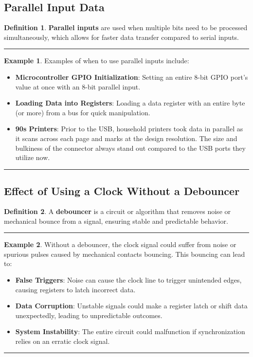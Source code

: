 \documentclass[12pt]{article}
\theoremstyle{definition}
\newtheorem{definition}{Definition}
\newtheorem{example}{Example}
\newenvironment{examp}
{
	\vspace{.5cm}
	\hrule
\begin{example}\upshape}
	{\hrule
		\vspace{0.5cm}
\end{example}}
\begin{document}
\subsection*{Parallel Input Data}
\begin{definition}
	\textbf{Parallel inputs} are used when multiple bits need to be processed simultaneously, which allows for faster data transfer compared to serial inputs.
\end{definition}

\begin{examp}
	Examples of when to use parallel inputs include:
	\begin{itemize}
		\item \textbf{Microcontroller GPIO Initialization}: Setting an entire 8-bit GPIO port’s value at once with an 8-bit parallel input.
		\item \textbf{Loading Data into Registers}: Loading a data register with an entire byte (or more) from a bus for quick manipulation.
		\item \textbf{90s Printers}: Prior to the USB, household printers took data in parallel as it scans across each page and
		      marks at the design resolution. The size and bulkiness of the
		      connector always stand out compared to the USB ports they utilize now.
	\end{itemize}
\end{examp}

\subsection*{Effect of Using a Clock Without a Debouncer}

\begin{definition}
	A \textbf{debouncer} is a circuit or algorithm that removes noise or mechanical bounce from a signal, ensuring stable and predictable behavior.
\end{definition}
\begin{examp}
	Without a debouncer, the clock signal could suffer from noise or spurious pulses caused by mechanical contacts bouncing. This bouncing can lead to:
	\begin{itemize}
		\item \textbf{False Triggers}: Noise can cause the clock line to trigger unintended edges, causing registers to latch incorrect data.
		\item \textbf{Data Corruption}: Unstable signals could make a register latch or shift data unexpectedly, leading to unpredictable outcomes.
		\item \textbf{System Instability}: The entire circuit could malfunction if synchronization relies on an erratic clock signal.
	\end{itemize}
\end{examp}
\end{document}
